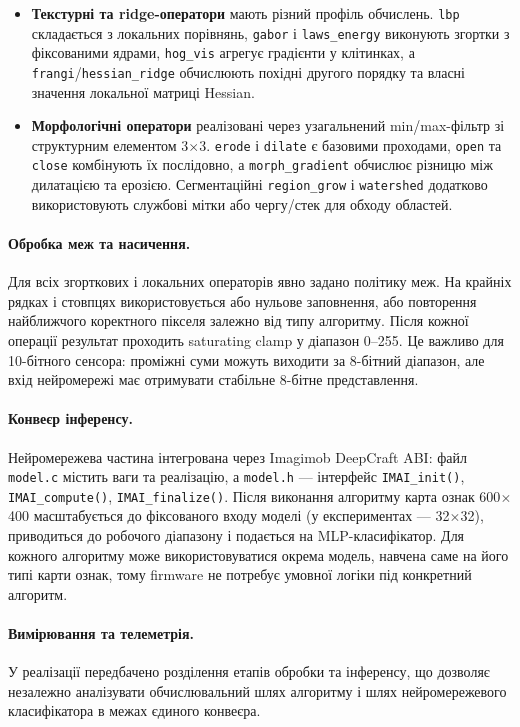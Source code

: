 \documentclass[a4paper,12pt]{article}
\begin{document}
\begin{itemize}
	\item \textbf{Текстурні та ridge-оператори} мають різний профіль обчислень. \texttt{lbp} складається з локальних порівнянь, \texttt{gabor} і \texttt{laws\_energy} виконують згортки з фіксованими ядрами, \texttt{hog\_vis} агрегує градієнти у клітинках, а \texttt{frangi}/\texttt{hessian\_ridge} обчислюють похідні другого порядку та власні значення локальної матриці Hessian.
	\item \textbf{Морфологічні оператори} реалізовані через узагальнений min/max-фільтр зі структурним елементом 3$\times$3. \texttt{erode} і \texttt{dilate} є базовими проходами, \texttt{open} та \texttt{close} комбінують їх послідовно, а \texttt{morph\_gradient} обчислює різницю між дилатацією та ерозією. Сегментаційні \texttt{region\_grow} і \texttt{watershed} додатково використовують службові мітки або чергу/стек для обходу областей.
\end{itemize}

\paragraph{Обробка меж та насичення.}
Для всіх згорткових і локальних операторів явно задано політику меж. На крайніх рядках і стовпцях використовується або нульове заповнення, або повторення найближчого коректного пікселя залежно від типу алгоритму. Після кожної операції результат проходить saturating clamp у діапазон 0--255. Це важливо для 10-бітного сенсора: проміжні суми можуть виходити за 8-бітний діапазон, але вхід нейромережі має отримувати стабільне 8-бітне представлення.

\paragraph{Конвеєр інференсу.}
Нейромережева частина інтегрована через Imagimob DeepCraft ABI: файл \texttt{model.c} містить ваги та реалізацію, а \texttt{model.h} --- інтерфейс \texttt{IMAI\_init()}, \texttt{IMAI\_compute()}, \texttt{IMAI\_finalize()}. Після виконання алгоритму карта ознак 600$\times$400 масштабується до фіксованого входу моделі (у експериментах --- 32$\times$32), приводиться до робочого діапазону і подається на MLP-класифікатор. Для кожного алгоритму може використовуватися окрема модель, навчена саме на його типі карти ознак, тому firmware не потребує умовної логіки під конкретний алгоритм.

\paragraph{Вимірювання та телеметрія.}
У реалізації передбачено розділення етапів обробки та інференсу, що дозволяє незалежно аналізувати обчислювальний шлях алгоритму і шлях нейромережевого класифікатора в межах єдиного конвеєра.
\end{document}
